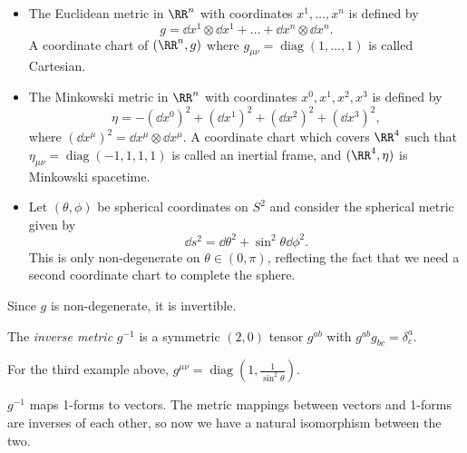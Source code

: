 \documentclass{jknotes}
\begin{document}
\begin{eg}
    \begin{itemize}
        \item The Euclidean metric in \(\RR^n\) with coordinates \(x^1,\dots,x^n\) is defined by
            \begin{equation}
                g = \dd{x^1}\otimes\dd{x^1} + \dots + \dd{x^n}\otimes\dd{x^n}.
            \end{equation}
            A coordinate chart of \((\RR^n,g)\) where \(g_{\mu\nu} = \operatorname{diag}(1,\dots,1)\) is called Cartesian.
        \item The Minkowski metric in \(\RR^n\) with coordinates \(x^0,x^1,x^2,x^3\) is defined by
            \begin{equation}
                \eta = -(\dd{x^0})^2 + (\dd{x^1})^2 + (\dd{x^2})^2 + (\dd{x^3})^2,
            \end{equation}
            where \((\dd{x^\mu})^2 = \dd{x^\mu}\otimes\dd{x^\mu}\). A coordinate chart which covers \(\RR^4\) such that \(\eta_{\mu\nu} = \operatorname{diag}(-1,1,1,1)\) is called an inertial frame, and \((\RR^4,\eta)\) is Minkowski spacetime.
        \item Let \((\theta,\phi)\) be spherical coordinates on \(S^2\) and consider the spherical metric given by
            \begin{equation}
                \dd{s}^2 = \dd{\theta}^2 + \sin^2\theta\dd{\phi}^2.
            \end{equation}
            This is only non-degenerate on \(\theta\in (0,\pi)\), reflecting the fact that we need a second coordinate chart to complete the sphere.
    \end{itemize}
\end{eg}

Since \(g\) is non-degenerate, it is invertible.
\begin{defn}
    The \emph{inverse metric} \(g^{-1}\) is a symmetric \((2,0)\) tensor \(g^{ab}\) with \(g^{ab}g_{bc} = \delta^a_c\).
\end{defn}
\begin{eg}
    For the third example above, \(g^{\mu\nu} = \operatorname{diag}\left(1,\frac1{\sin^2\theta}\right)\).
\end{eg}
\(g^{-1}\) maps 1-forms to vectors. The metric mappings between vectors and 1-forms are inverses of each other, so now we have a natural isomorphism between the two.
\end{document}
